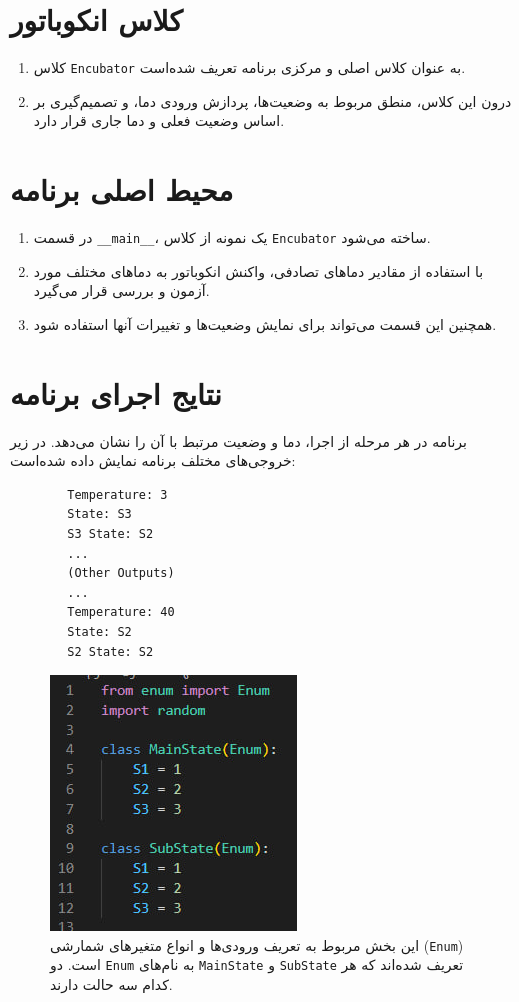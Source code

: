 \section*{کلاس انکوباتور}

\begin{enumerate}
	\item کلاس \texttt{Encubator} به عنوان کلاس اصلی و مرکزی برنامه تعریف شده‌است.
	\item درون این کلاس، منطق مربوط به وضعیت‌ها، پردازش ورودی دما، و تصمیم‌گیری بر اساس وضعیت فعلی و دما جاری قرار دارد.
\end{enumerate}

\section*{محیط اصلی برنامه}

\begin{enumerate}
	\item در قسمت \texttt{\_\_main\_\_}، یک نمونه از کلاس \texttt{Encubator} ساخته می‌شود.
	\item با استفاده از مقادیر دماهای تصادفی، واکنش انکوباتور به دماهای مختلف مورد آزمون و بررسی قرار می‌گیرد.
	\item همچنین این قسمت می‌تواند برای نمایش وضعیت‌ها و تغییرات آنها استفاده شود.
\end{enumerate}

\section*{نتایج اجرای برنامه}

برنامه در هر مرحله از اجرا، دما و وضعیت مرتبط با آن را نشان می‌دهد. در زیر خروجی‌های مختلف برنامه نمایش داده شده‌است:

\begin{LTR}
	\begin{lstlisting}
		Temperature: 3
		State: S3
		S3 State: S2
		...
		(Other Outputs)
		...
		Temperature: 40
		State: S2
		S2 State: S2
	\end{lstlisting}
\end{LTR}

\begin{figure}[h]
	\centering
	\includegraphics{1.jpg}
	\caption{
		این بخش مربوط به تعریف ورودی‌‌ها و انواع متغیرهای شمارشی (\texttt{Enum}) است. 
		دو \texttt{Enum} به نام‌های \texttt{MainState} و \texttt{SubState} تعریف شده‌اند که هر کدام سه حالت 
		 دارند.
	}
	\label{fig:label1}
\end{figure}

